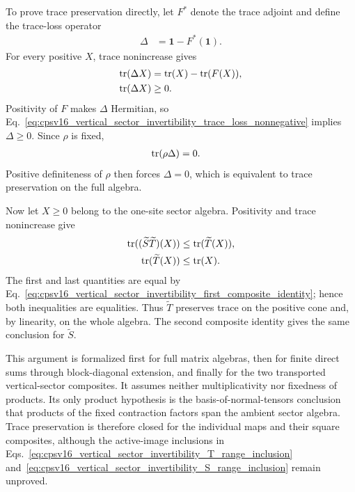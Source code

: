 \documentclass{article}
\begin{document}
To prove trace preservation directly, let $F^*$ denote the trace adjoint and
define the trace-loss operator
\begin{align}
    \Delta
        &= \mathbf 1-F^*(\mathbf 1).
    \label{eq:cpsv16_vertical_sector_invertibility_trace_loss_operator}
\end{align}
For every positive $X$, trace nonincrease gives
\begin{align}
    \operatorname{tr}(\Delta X)
        &= \operatorname{tr}(X)-\operatorname{tr}(F(X)),
    \label{eq:cpsv16_vertical_sector_invertibility_trace_loss_identity}\\
    \operatorname{tr}(\Delta X)
        &\geq 0.
    \label{eq:cpsv16_vertical_sector_invertibility_trace_loss_nonnegative}
\end{align}
Positivity of $F$ makes $\Delta$ Hermitian, so
Eq.~\ref{eq:cpsv16_vertical_sector_invertibility_trace_loss_nonnegative}
implies $\Delta\geq0$. Since $\rho$ is fixed,
\begin{align}
    \operatorname{tr}(\rho\Delta)
        &= 0.
    \label{eq:cpsv16_vertical_sector_invertibility_fixed_trace_loss_zero}
\end{align}
Positive definiteness of $\rho$ then forces $\Delta=0$, which is equivalent
to trace preservation on the full algebra.

Now let $X\geq0$ belong to the one-site sector algebra. Positivity and trace
nonincrease give
\begin{align}
    \operatorname{tr}((\widetilde S\widetilde T)(X))
        &\leq \operatorname{tr}(\widetilde T(X)),
    \label{eq:cpsv16_vertical_sector_invertibility_trace_sandwich_first}\\
    \operatorname{tr}(\widetilde T(X))
        &\leq \operatorname{tr}(X).
    \label{eq:cpsv16_vertical_sector_invertibility_trace_sandwich_second}
\end{align}
The first and last quantities are equal by
Eq.~\ref{eq:cpsv16_vertical_sector_invertibility_first_composite_identity};
hence both inequalities are equalities. Thus $\widetilde T$ preserves trace
on the positive cone and, by linearity, on the whole algebra. The second
composite identity gives the same conclusion for $\widetilde S$.

This argument is formalized first for full matrix algebras, then for finite
direct sums through block-diagonal extension, and finally for the two
transported vertical-sector composites. It assumes neither multiplicativity
nor fixedness of products. Its only product hypothesis is the
basis-of-normal-tensors conclusion that products of the fixed contraction
factors span the ambient sector algebra. Trace preservation is therefore
closed for the individual maps and their square composites, although the
active-image inclusions in
Eqs.~\ref{eq:cpsv16_vertical_sector_invertibility_T_range_inclusion}
and~\ref{eq:cpsv16_vertical_sector_invertibility_S_range_inclusion} remain
unproved.
\end{document}
